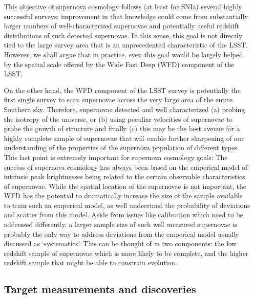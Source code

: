 This objective of supernova cosmology follows (at least for SNIa) several
highly successful surveys; improvement in that knowledge could come from
substantially larger numbers of well-characterized supernovae and potentially
useful redshift distributions of such detected supernovae. In this sense, this
goal is not directly tied to the large survey area that is an unprecedented
characteristic of the LSST. However, we shall argue that in practice, even this
goal would be largely helped by the spatial scale offered by the Wide Fast Deep
(WFD) component of the LSST. 

On the other hand, the WFD component of the LSST survey is potentially the 
first single survey to scan supernovae across the very large area of the
entire Southern sky. Therefore, supernovae detected and well characterized
(a) probing the isotropy of the universe, or (b) using peculiar velocities of 
supernovae to probe the growth of structure and finally (c) this may be the
best avenue for a highly complete sample of supernovae that will enable further
sharpening of our understanding of the properties of the supernova population 
of different types. 
This last point is extremely important for supernova cosmology goals: The success of supernova cosmology has always been based on the emperical model of intrinsic peak brightnesses being related to the certain observable characteristics of
supernovae. While the spatial location of the supernovae is not important, the 
WFD has the potential to dramatically increase the size of the sample 
available to train such an emperical model, as well understand the probability of deviations and scatter from this model. Aside from issues like calibration 
which need to be addressed differently, a larger sample size of such well measured supernovae is probably the only way to address deviations from the emperical
model usually discussed as `systematics'. This can be thought of in two 
components: the low redshift sample of supernovae which is more likely to be complete, and the higher redshift sample that might be able to constrain evolution. 

\subsection{Target measurements and discoveries}
\label{sec:keyword:targets}


